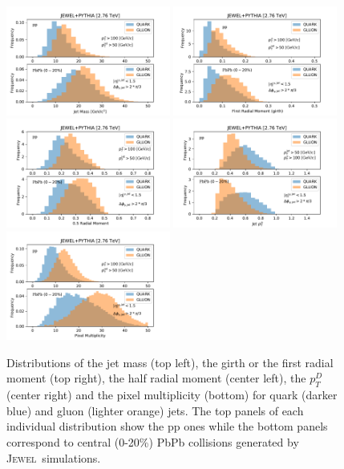 \documentclass[notoc,preprintnumbers]{JHEP3}
\newcommand{\jw}{\textsc{Jewel}~}
\begin{document}
\begin{figure}[h]
	   \centering
	   \includegraphics[width=0.48\textwidth]{Fig2a}
	   \includegraphics[width=0.48\textwidth]{Fig2b}
	   \includegraphics[width=0.48\textwidth]{Fig2c}
	   \includegraphics[width=0.48\textwidth]{Fig2d}
	   \includegraphics[width=0.48\textwidth]{Fig2e}
	   \caption{Distributions of the jet mass (top left), the girth or the first radial moment (top right), the half radial moment (center left), the $p^{D}_{T}$ (center right) and the pixel multiplicity (bottom) for quark (darker blue) and gluon (lighter orange) jets. The top panels of each individual distribution show the pp ones while the bottom panels correspond to central (0-20\%) PbPb collisions generated by \jw simulations.}
	   \label{fig:jetdistributons_pp_pbpb}
	\end{figure}
\end{document}
